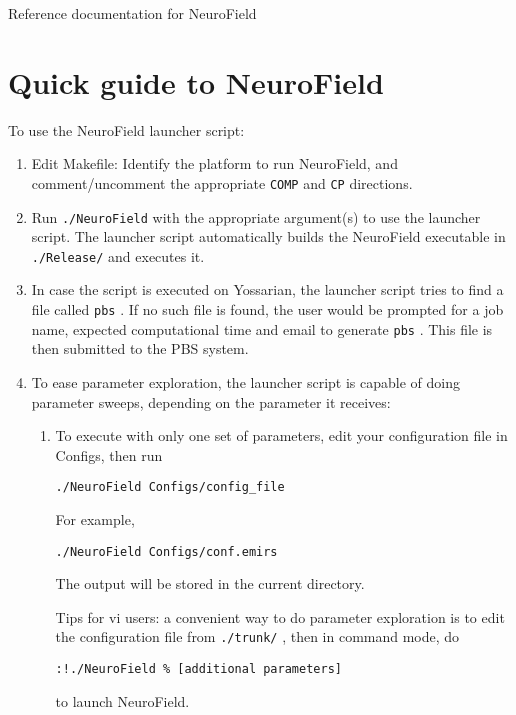 \documentclass[12pt,a4paper]{article}
\newcommand{\type}[1]{ {\small\small\tt #1} }
\begin{document}
 

{\center \Huge{Reference documentation for NeuroField}}

\section{Quick guide to NeuroField}

To use the NeuroField launcher script:
\begin{enumerate}

\item Edit Makefile: Identify the platform to run NeuroField, and comment/uncomment the appropriate \type{COMP} and \type{CP} directions.

\item Run \type{./NeuroField} with the appropriate argument(s) to use the launcher script. The launcher script automatically builds the NeuroField executable in \type{./Release/} and executes it.

\item In case the script is executed on Yossarian, the launcher script tries to find a file called \type{pbs}. If no such file is found, the user would be prompted for a job name, expected computational time and email to generate \type{pbs}. This file is then submitted to the PBS system.

\item To ease parameter exploration, the launcher script is capable of doing parameter sweeps, depending on the parameter it receives:

\begin{enumerate}

\item To execute with only one set of parameters, edit your configuration file in Configs, then run
\begin{lstlisting}
./NeuroField Configs/config_file
\end{lstlisting}
For example,
\begin{lstlisting}
./NeuroField Configs/conf.emirs
\end{lstlisting}
The output will be stored in the current directory.

Tips for vi users: a convenient way to do parameter exploration is to edit the configuration file from \type{./trunk/}, then in command mode, do
\begin{lstlisting}
:!./NeuroField % [additional parameters]
\end{lstlisting}
to launch NeuroField.


\end{enumerate}
\end{enumerate}
\end{document}
